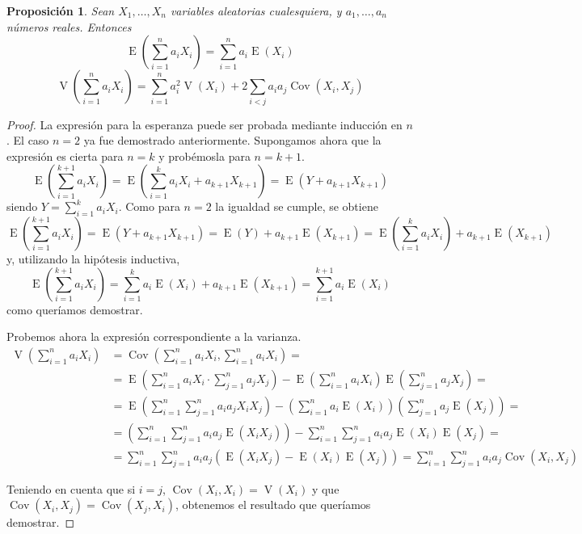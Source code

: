 \documentclass[11pt]{article}
\theoremstyle{plain}
\newtheorem*{pro}{Proposición}
\theoremstyle{definition}
\theoremstyle{remark}
\newcommand{\esp}[0]{\ensuremath{\operatorname{E}}}  %
\newcommand{\var}[0]{\ensuremath{\operatorname{V}}}  %
\newcommand{\cov}[0]{\ensuremath{\operatorname{Cov}}}  %
\begin{document}
      \begin{pro}
        Sean $X_1, \dots, X_n$ variables aleatorias cualesquiera, y $a_1,\dots,a_n$ números reales. Entonces
        \[ \esp\left( \sum_{i=1}^n a_i X_i \right) = \sum_{i=1}^n a_i \esp(X_i) \]
        \[ \var\left( \sum_{i=1}^n a_i X_i \right) = \sum_{i=1}^n a_i^2 \var(X_i) + 2 \sum_{i < j} a_i a_j \cov(X_i,X_j) \]
      \end{pro}
      \begin{proof}
        La expresión para la esperanza puede ser probada mediante inducción en $n$. El caso $n = 2$ ya fue demostrado anteriormente. Supongamos ahora que la expresión es cierta para $n = k$ y probémosla para $n = k + 1$.
        \[ \esp \left( \sum_{i=1}^{k+1} a_i X_i \right) = \esp \left( \sum_{i=1}^k a_i X_i + a_{k+1} X_{k+1} \right) = \esp (Y + a_{k+1} X_{k+1}) \] 
        siendo $Y = \sum_{i=1}^k a_i X_i$. Como para $n = 2$ la igualdad se cumple, se obtiene
        \[ \esp \left( \sum_{i=1}^{k+1} a_i X_i \right) = \esp(Y + a_{k+1} X_{k+1}) = \esp(Y) + a_{k+1} \esp(X_{k+1}) = \esp \left( \sum_{i=1}^k a_i X_i \right) + a_{k+1} \esp(X_{k+1}) \]
        y, utilizando la hipótesis inductiva,
        \[ \esp \left( \sum_{i=1}^{k+1} a_i X_i \right) = \sum_{i=1}^k a_i \esp(X_i) + a_{k+1} \esp(X_{k+1}) = \sum_{i=1}^{k+1} a_i \esp(X_i) \]
        como queríamos demostrar.

        Probemos ahora la expresión correspondiente a la varianza.
        \[ \begin{split}
          \var \left( \sum_{i=1}^n a_i X_i \right) &= \cov \left( \sum_{i=1}^n a_i X_i, \sum_{i=1}^n a_i X_i \right) = \\
          &= \esp \left( \sum_{i=1}^n a_i X_i \cdot \sum_{j=1}^n a_j X_j \right) - \esp \left( \sum_{i=1}^n a_i X_i \right) \esp \left( \sum_{j=1}^n a_j X_j \right) = \\
          &= \esp \left( \sum_{i=1}^n \sum_{j=1}^n a_i a_j X_i X_j \right) - \left( \sum_{i=1}^n a_i \esp(X_i) \right) \left( \sum_{j=1}^n a_j \esp(X_j) \right) = \\
          &= \left( \sum_{i=1}^n \sum_{j=1}^n a_i a_j \esp (X_i X_j) \right) - \sum_{i=1}^n \sum_{j=1}^n a_i a_j \esp(X_i) \esp(X_j) = \\
          &= \sum_{i=1}^n \sum_{j=1}^n a_i a_j \left( \esp (X_i X_j) - \esp(X_i) \esp(X_j) \right) = \sum_{i=1}^n \sum_{j=1}^n a_i a_j \cov(X_i, X_j)
        \end{split} \]

        Teniendo en cuenta que si $i = j$, $\cov(X_i, X_i) = \var(X_i)$ y que $\cov(X_i, X_j) = \cov(X_j, X_i)$, obtenemos el resultado que queríamos demostrar.
      \end{proof}
\end{document}
